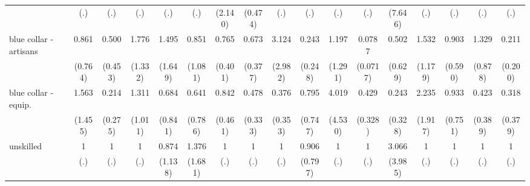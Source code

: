 {\begin{tabular}{l*{16}{c}}
                    &         (.)         &         (.)         &         (.)         &         (.)         &         (.)         &     (2.140)         &     (0.474)         &         (.)         &         (.)         &         (.)         &         (.)         &     (7.646)         &         (.)         &         (.)         &         (.)         &         (.)         \\
[1em]
blue collar - artisans&       0.861         &       0.500         &       1.776         &       1.495         &       0.851         &       0.765         &       0.673         &       3.124         &       0.243         &       1.197         &      0.0787\sym{**} &       0.502         &       1.532         &       0.903         &       1.329         &       0.211         \\
                    &     (0.764)         &     (0.453)         &     (1.332)         &     (1.649)         &     (1.081)         &     (0.401)         &     (0.377)         &     (2.982)         &     (0.248)         &     (1.291)         &    (0.0717)         &     (0.629)         &     (1.179)         &     (0.590)         &     (0.878)         &     (0.200)         \\
[1em]
blue collar - equip.&       1.563         &       0.214         &       1.311         &       0.684         &       0.641         &       0.842         &       0.478         &       0.376         &       0.795         &       4.019         &       0.429         &       0.243         &       2.235         &       0.933         &       0.423         &       0.318         \\
                    &     (1.455)         &     (0.275)         &     (1.011)         &     (0.841)         &     (0.786)         &     (0.461)         &     (0.333)         &     (0.353)         &     (0.747)         &     (4.530)         &     (0.328)         &     (0.328)         &     (1.917)         &     (0.751)         &     (0.389)         &     (0.379)         \\
[1em]
unskilled           &           1         &           1         &           1         &       0.874         &       1.376         &           1         &           1         &           1         &       0.906         &           1         &           1         &       3.066         &           1         &           1         &           1         &           1         \\
                    &         (.)         &         (.)         &         (.)         &     (1.138)         &     (1.681)         &         (.)         &         (.)         &         (.)         &     (0.797)         &         (.)         &         (.)         &     (3.985)         &         (.)         &         (.)         &         (.)         &         (.)         \\

\end{tabular}}

